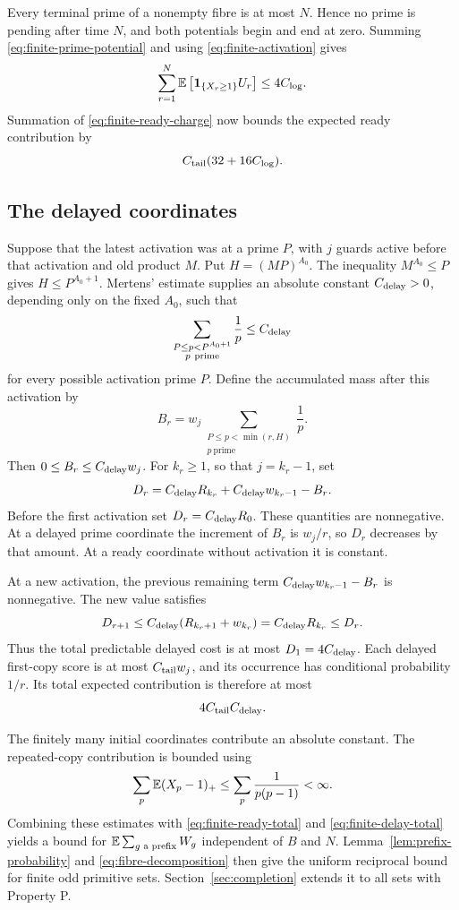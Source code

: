 Every terminal prime of a nonempty fibre is at most \(N\). Hence no
prime is pending after time \(N\), and both potentials begin and end
at zero. Summing \eqref{eq:finite-prime-potential} and using
\eqref{eq:finite-activation} gives
\[
 \sum_{r=1}^N\mathbb E\left[\mathbf 1_{\{X_r\ge1\}}U_r\right]
 \le4C_{\log}.
\]
Summation of \eqref{eq:finite-ready-charge} now bounds the expected
ready contribution by
\begin{equation}\label{eq:finite-ready-total}
 C_{\rm tail}(32+16C_{\log}).
\end{equation}

\subsection{The delayed coordinates}

Suppose that the latest activation was at a prime \(P\), with \(j\)
guards active before that activation and old product \(M\). Put
\(H=(MP)^{A_0}\). The inequality \(M^{A_0}\le P\) gives
\(H\le P^{A_0+1}\). Mertens' estimate supplies an absolute constant
\(C_{\rm delay}>0\), depending only on the fixed \(A_0\), such that
\[
 \sum_{\substack{P\le p<P^{A_0+1}\\p\ \mathrm{prime}}}\frac1p
 \le C_{\rm delay}
\]
for every possible activation prime \(P\). Define the accumulated
mass after this activation by
\[
 B_r=w_j\sum_{\substack{P\le p<\min(r,H)\\p\ \mathrm{prime}}}\frac1p.
\]
Then \(0\le B_r\le C_{\rm delay}w_j\). For \(k_r\ge1\), so that
\(j=k_r-1\), set
\[
 D_r=C_{\rm delay}R_{k_r}+C_{\rm delay}w_{k_r-1}-B_r.
\]
Before the first activation set \(D_r=C_{\rm delay}R_0\).
These quantities are nonnegative. At a delayed prime coordinate the
increment of \(B_r\) is \(w_j/r\), so \(D_r\) decreases by that amount.
At a ready coordinate without activation it is constant.

At a new activation, the previous remaining term
\(C_{\rm delay}w_{k_r-1}-B_r\) is nonnegative. The new value satisfies
\[
 D_{r+1}\le C_{\rm delay}(R_{k_r+1}+w_{k_r})
           =C_{\rm delay}R_{k_r}\le D_r.
\]
Thus the total predictable delayed cost is at most
\(D_1=4C_{\rm delay}\). Each delayed first-copy score is at most
\(C_{\rm tail}w_j\), and its occurrence has conditional probability
\(1/r\). Its total expected contribution is therefore at most
\begin{equation}\label{eq:finite-delay-total}
 4C_{\rm tail}C_{\rm delay}.
\end{equation}

The finitely many initial coordinates contribute an absolute
constant. The repeated-copy contribution is bounded using
\[
 \sum_p\mathbb E(X_p-1)_+
 \le\sum_p\frac1{p(p-1)}<\infty.
\]
Combining these estimates with \eqref{eq:finite-ready-total} and
\eqref{eq:finite-delay-total} yields a bound for
\(\mathbb E\sum_{g\text{ a prefix}}W_g\) independent of \(B\) and \(N\).
Lemma~\ref{lem:prefix-probability} and
\eqref{eq:fibre-decomposition} then give the uniform reciprocal bound
for finite odd primitive sets. Section~\ref{sec:completion} extends it
to all sets with Property P.

